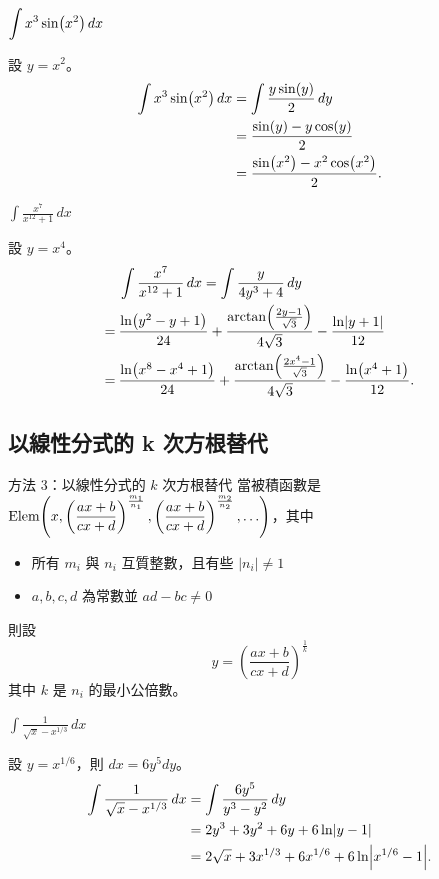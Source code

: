 \documentclass{beamer}
\newcommand{\Left} {\mathopen{}\mathclose\bgroup\left}
\newcommand{\Right}{\aftergroup\egroup\right}
\newcommand{\Elem}{\operatorname{Elem}}
\theoremstyle{remark}
\begin{document}
\begin{CJK}{UTF8}{bsmi}
\begin{frame}{$\displaystyle \int x^3 \sin \Left( x^2 \Right)\,dx$}
  \begin{solution}
    設 $y = x^2$。
    \begin{align*}
      \int x^3 \sin \Left( x^2 \Right)\,dx &= \int \frac{y \sin(y)}{2}\,dy\\
	&= \frac{\sin(y) - y\cos(y)}{2}\\
	&= \frac{\sin \Left( x^2 \Right) - x^2 \cos \Left( x^2 \Right)}{2}.
    \end{align*}
  \end{solution}
\end{frame}

\begin{frame}{$\displaystyle \int \frac{x^7}{x^{12} + 1}\,dx$}
  \begin{solution}
    設 $y = x^4$。
    \begin{align*}
	 & \int \frac{x^7}{x^{12} + 1}\,dx = \int \frac{y}{4y^3 + 4}\,dy\\
      =\:& \frac{\ln \Left( y^2 - y + 1 \Right)}{24} + \frac{\arctan \Left( \frac{2y - 1}{\sqrt3} \Right)}{4\sqrt3}
	  - \frac{\ln \Left| y + 1 \Right|}{12}\\
      =\:& \frac{\ln \Left( x^8 - x^4 + 1 \Right)}{24} + \frac{\arctan \Left( \frac{2x^4 - 1}{\sqrt3} \Right)}{4\sqrt3}
	  - \frac{\ln \Left( x^4 + 1 \Right)}{12}.
    \end{align*}
  \end{solution}
\end{frame}

\subsection[根式替代]{以線性分式的 k 次方根替代}
\begin{frame}{方法 3：以線性分式的 $k$ 次方根替代}
  當被積函數是 $\Elem \Left( x, \left( \dfrac{ax + b}{cx + d} \right)^\frac{m_1}{n_1}, \left( \dfrac{ax + b}{cx + d}
  \right)^\frac{m_2}{n_2}, \dots \Right)$，其中
  \begin{itemize}
    \item 所有 $m_i$ 與 $n_i$ 互質整數，且有些 $|n_i| \ne 1$
    \item $a,b,c,d$ 為常數並 $ad - bc \ne 0$
  \end{itemize}
  則設 
  \[y = \left( \dfrac{ax + b}{cx + d} \right)^\frac1k\]
  其中 $k$ 是 $n_i$ 的最小公倍數。
\end{frame}

\begin{frame}{$\displaystyle \int \frac{1}{\sqrt x - x^{1/3}}\,dx$}
  \begin{solution}
    設 $y = x^{1/6}$，則 $dx = 6y^5 dy$。
    \begin{align*}
      \int \frac{1}{\sqrt x - x^{1/3}}\,dx &= \int \frac{6y^5}{y^3 - y^2}\,dy\\
	&= 2y^3 + 3y^2 + 6y + 6 \ln \Left| y-1 \Right|\\
	&= 2 \sqrt x + 3 x^{1/3} + 6 x^{1/6} + 6 \ln \Left| x^{1/6} - 1 \Right|.
    \end{align*}
  \end{solution}
\end{frame}


\end{CJK}
\end{document}
